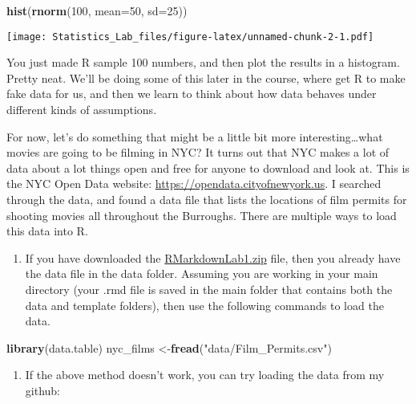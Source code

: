 \documentclass[
]{book}
\newenvironment{Shaded}{\begin{snugshade}}{\end{snugshade}}
\newcommand{\AttributeTok}[1]{\textcolor[rgb]{0.13,0.29,0.53}{#1}}
\newcommand{\DecValTok}[1]{\textcolor[rgb]{0.00,0.00,0.81}{#1}}
\newcommand{\FunctionTok}[1]{\textcolor[rgb]{0.13,0.29,0.53}{\textbf{#1}}}
\newcommand{\NormalTok}[1]{#1}
\newcommand{\OtherTok}[1]{\textcolor[rgb]{0.56,0.35,0.01}{#1}}
\newcommand{\StringTok}[1]{\textcolor[rgb]{0.31,0.60,0.02}{#1}}
\providecommand{\tightlist}{%
  \setlength{\itemsep}{0pt}\setlength{\parskip}{0pt}}
\begin{document}
\begin{Shaded}
\begin{Highlighting}[]
\FunctionTok{hist}\NormalTok{(}\FunctionTok{rnorm}\NormalTok{(}\DecValTok{100}\NormalTok{, }\AttributeTok{mean=}\DecValTok{50}\NormalTok{, }\AttributeTok{sd=}\DecValTok{25}\NormalTok{))}
\end{Highlighting}
\end{Shaded}

\texttt{[image: Statistics\_Lab\_files/figure-latex/unnamed-chunk-2-1.pdf]}

You just made R sample 100 numbers, and then plot the results in a histogram. Pretty neat. We'll be doing some of this later in the course, where get R to make fake data for us, and then we learn to think about how data behaves under different kinds of assumptions.

For now, let's do something that might be a little bit more interesting\ldots what movies are going to be filming in NYC? It turns out that NYC makes a lot of data about a lot things open and free for anyone to download and look at. This is the NYC Open Data website: \url{https://opendata.cityofnewyork.us}. I searched through the data, and found a data file that lists the locations of film permits for shooting movies all throughout the Burroughs. There are multiple ways to load this data into R.

\begin{enumerate}
\def\labelenumi{\arabic{enumi}.}
\tightlist
\item
  If you have downloaded the \href{https://github.com/CrumpLab/statisticsLab/raw/master/RMarkdownsLab.zip}{RMarkdownLab1.zip} file, then you already have the data file in the data folder. Assuming you are working in your main directory (your .rmd file is saved in the main folder that contains both the data and template folders), then use the following commands to load the data.
\end{enumerate}

\begin{Shaded}
\begin{Highlighting}[]
\FunctionTok{library}\NormalTok{(data.table)}
\NormalTok{nyc\_films }\OtherTok{\textless{}{-}}\FunctionTok{fread}\NormalTok{(}\StringTok{"data/Film\_Permits.csv"}\NormalTok{)}
\end{Highlighting}
\end{Shaded}

\begin{enumerate}
\def\labelenumi{\arabic{enumi}.}
\setcounter{enumi}{1}
\tightlist
\item
  If the above method doesn't work, you can try loading the data from my github:
\end{enumerate}
\end{document}
